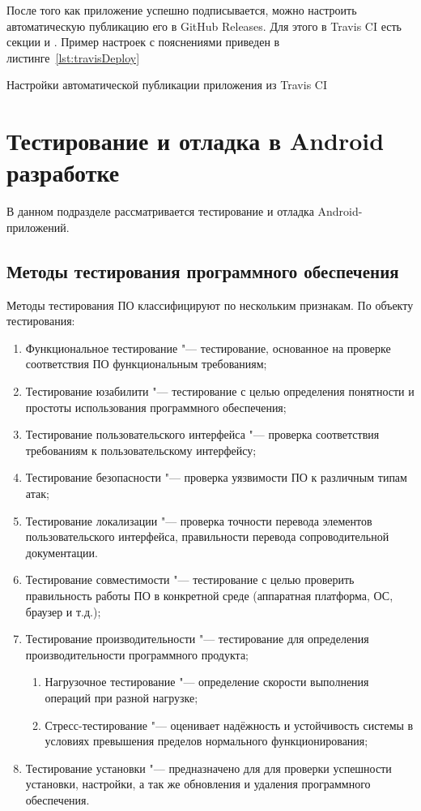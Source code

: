 После того как приложение успешно подписывается, можно настроить автоматическую публикацию его в GitHub Releases.
Для этого в Travis CI есть секции  и .
Пример настроек с пояснениями приведен в листинге~\ref{lst:travisDeploy}

\begin{listing}[h]
  \caption{Настройки автоматической публикации приложения из Travis CI}
  \label{lst:travisDeploy}
\end{listing}

\section{Тестирование и отладка в Android разработке}
\label{sec:testing}

В данном подразделе рассматривается тестирование и отладка Android-приложений.

\subsection{Методы тестирования программного обеспечения}
\label{subsec:testing:methods}

Методы тестирования ПО классифицируют по нескольким признакам.
По объекту тестирования:
\begin{enumerate}
  \item Функциональное тестирование "--- тестирование, основанное на проверке соответствия ПО функциональным требованиям;
  \item Тестирование юзабилити "--- тестирование с целью определения понятности и простоты использования программного обеспечения;
  \item Тестирование пользовательского интерфейса "--- проверка соответствия требованиям к пользовательскому интерфейсу;
  \item Тестирование безопасности "--- проверка уязвимости ПО к различным типам атак;
  \item Тестирование локализации "--- проверка точности перевода элементов пользовательского интерфейса, правильности перевода сопроводительной документации.
  \item Тестирование совместимости "--- тестирование с целью проверить правильность работы ПО в конкретной среде (аппаратная платформа, ОС, браузер и т.д.);
  \item Тестирование производительности "--- тестирование для определения производительности программного продукта;
  \begin{enumerate}
    \item Нагрузочное тестирование "--- определение скорости выполнения операций при разной нагрузке;
    \item Стресс-тестирование "--- оценивает надёжность и устойчивость системы в условиях превышения пределов нормального функционирования;
  \end{enumerate}
  \item Тестирование установки "--- предназначено для для проверки успешности установки, настройки, а так же обновления и удаления программного обеспечения.
\end{enumerate}


